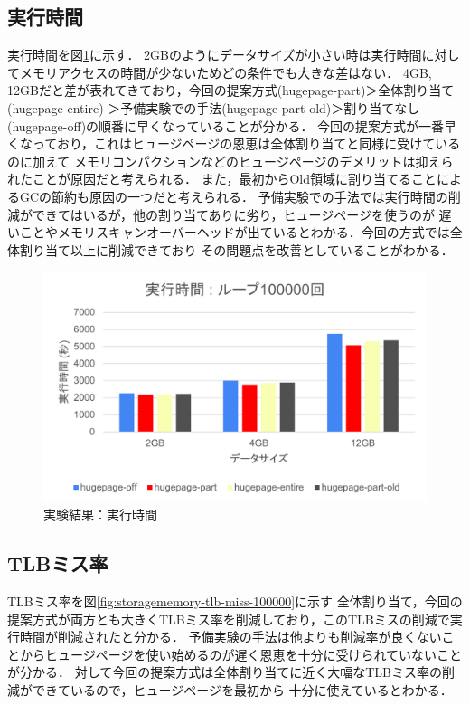 \subsection{実行時間}
実行時間を図\ref{fig:storagememory-exec-100000}に示す．
2GBのようにデータサイズが小さい時は実行時間に対してメモリアクセスの時間が少ないためどの条件でも大きな差はない．
4GB, 12GBだと差が表れてきており，今回の提案方式(hugepage-part)＞全体割り当て(hugepage-entire)
＞予備実験での手法(hugepage-part-old)＞割り当てなし(hugepage-off)の順番に早くなっていることが分かる．
今回の提案方式が一番早くなっており，これはヒュージページの恩恵は全体割り当てと同様に受けているのに加えて
メモリコンパクションなどのヒュージページのデメリットは抑えられたことが原因だと考えられる．
また，最初からOld領域に割り当てることによるGCの節約も原因の一つだと考えられる．
予備実験での手法では実行時間の削減ができてはいるが，他の割り当てありに劣り，ヒュージページを使うのが
遅いことやメモリスキャンオーバーヘッドが出ているとわかる．今回の方式では全体割り当て以上に削減できており
その問題点を改善としていることがわかる．

\begin{figure}[H]
  \centering
  \includegraphics[scale=0.6]{figures/experiment-new/storagememory/exec-100000.png}
  \caption{実験結果：実行時間}
  \label{fig:storagememory-exec-100000}
\end{figure}

\subsection{TLBミス率}
TLBミス率を図\ref{fig:storagememory-tlb-miss-100000}に示す
全体割り当て，今回の提案方式が両方とも大きくTLBミス率を削減しており，このTLBミスの削減で実行時間が削減されたと分かる．
予備実験の手法は他よりも削減率が良くないことからヒュージページを使い始めるのが遅く恩恵を十分に受けられていないことが分かる．
対して今回の提案方式は全体割り当てに近く大幅なTLBミス率の削減ができているので，ヒュージページを最初から
十分に使えているとわかる．


